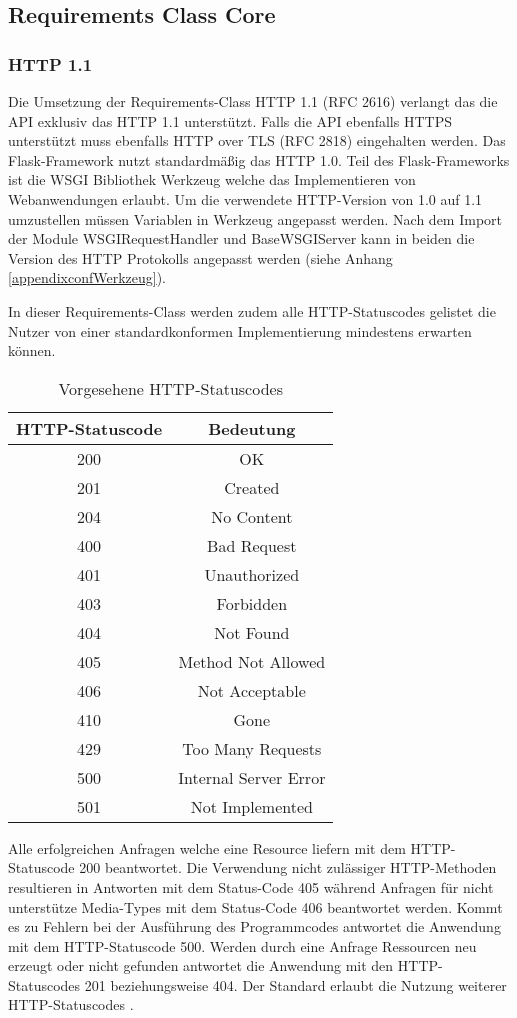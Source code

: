 \subsection{Requirements Class Core}
\subsubsection{HTTP 1.1}
Die Umsetzung der Requirements-Class HTTP 1.1 (RFC 2616) verlangt das die API exklusiv das HTTP 1.1 unterstützt. 
Falls die API ebenfalls HTTPS unterstützt muss ebenfalls HTTP over TLS (RFC 2818) eingehalten werden. 
Das Flask-Framework nutzt standardmäßig das HTTP 1.0. Teil des Flask-Frameworks ist die WSGI Bibliothek Werkzeug welche
das Implementieren von Webanwendungen erlaubt. Um die verwendete HTTP-Version von 1.0 auf 1.1 umzustellen müssen Variablen 
in Werkzeug angepasst werden. Nach dem Import der Module WSGIRequestHandler und BaseWSGIServer kann in beiden die 
Version des HTTP Protokolls angepasst werden (siehe Anhang \ref{appendixconfWerkzeug}). 

In dieser Requirements-Class werden zudem alle HTTP-Statuscodes gelistet die Nutzer von einer standardkonformen Implementierung mindestens erwarten können. 
\begin{table}[H]
    \caption{Vorgesehene HTTP-Statuscodes \cite{ogc_api_processes_core}}
    \centering
    \begin{tabular}{c c} 
        HTTP-Statuscode & Bedeutung\\ 
        \hline
        200 & OK\\
        201 & Created\\
        204 & No Content\\
        400 & Bad Request\\
        401 & Unauthorized\\
        403 & Forbidden\\
        404 & Not Found\\
        405 & Method Not Allowed\\
        406 & Not Acceptable\\
        410 & Gone\\
        429 & Too Many Requests\\
        500 & Internal Server Error\\
        501 & Not Implemented\\
    \end{tabular}\label{httpcodes}
\end{table}
Alle erfolgreichen Anfragen welche eine Resource liefern mit dem HTTP-Statuscode 200 beantwortet. Die Verwendung nicht zulässiger HTTP-Methoden resultieren 
in Antworten mit dem Status-Code 405 während Anfragen für nicht unterstütze Media-Types mit dem Status-Code 406 beantwortet werden. Kommt es zu Fehlern bei der Ausführung 
des Programmcodes antwortet die Anwendung mit dem HTTP-Statuscode 500. Werden durch eine Anfrage Ressourcen neu erzeugt oder nicht gefunden antwortet die Anwendung mit 
den HTTP-Statuscodes 201 beziehungsweise 404. Der Standard erlaubt die Nutzung weiterer HTTP-Statuscodes \cite{ogc_api_processes_core}.

